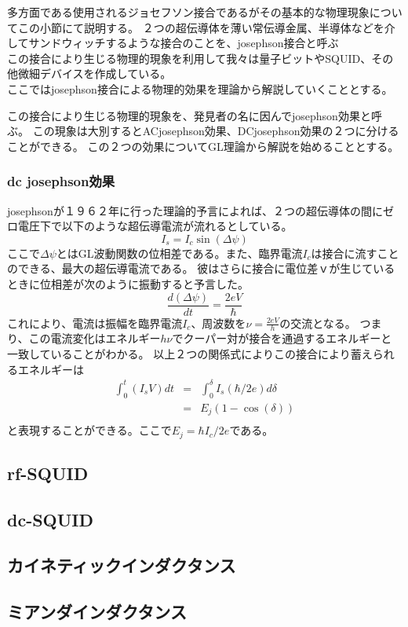             多方面である使用されるジョセフソン接合であるがその基本的な物理現象についてこの小節にて説明する。
            ２つの超伝導体を薄い常伝導金属、半導体などを介してサンドウィッチするような接合のことを、josephson接合と呼ぶ\\
            この接合により生じる物理的現象を利用して我々は量子ビットやSQUID、その他微細デバイスを作成している。\\
            ここではjosephson接合による物理的効果を理論から解説していくこととする。

    
            この接合により生じる物理的現象を、発見者の名に因んでjosephson効果と呼ぶ。
            この現象は大別するとACjosephson効果、DCjosephson効果の２つに分けることができる。
            この２つの効果についてGL理論から解説を始めることとする。
            \subsubsection{dc josephson効果}
                josephsonが１９６２年に行った理論的予言によれば、２つの超伝導体の間にゼロ電圧下で以下のような超伝導電流が流れるとしている。
                \begin{equation*}
                    I_s = I_c \sin(\Delta \psi)
                \end{equation*}
                ここで$\Delta \psi$とはGL波動関数の位相差である。また、臨界電流$I_c$は接合に流すことのできる、最大の超伝導電流である。
                彼はさらに接合に電位差ｖが生じているときに位相差が次のように振動すると予言した。
                \begin{equation*}
                    \frac{d(\Delta \psi)}{dt} = \frac{2eV}{\hbar}
                \end{equation*}
                これにより、電流は振幅を臨界電流$I_c$、周波数を$\nu = \frac{2eV}{h}$の交流となる。
                つまり、この電流変化はエネルギー$h\nu$でクーパー対が接合を通過するエネルギーと一致していることがわかる。
                以上２つの関係式によりこの接合により蓄えられるエネルギーは
                \begin{eqnarray}
                    \int_0^{t} (I_s V)dt&=&\int_{0}^{\delta} I_s(\hbar/2e)d\delta\\
                    &=&E_j(1-\cos(\delta))\\
                \end{eqnarray}
                と表現することができる。ここで$E_j=\hbar I_c/2e$である。
    \subsection{rf-SQUID}
                
    \subsection{dc-SQUID}

    \subsection{カイネティックインダクタンス}
    
    \subsection{ミアンダインダクタンス}
